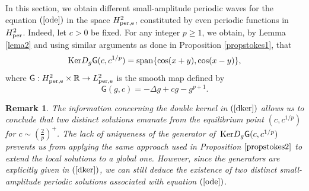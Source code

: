 \documentclass[12pt,reqno,a4paper]{amsart} %
\newcommand{\Ker}{{\rm \,Ker}}
\numberwithin{equation}{section}
\numberwithin{figure}{section}
\newtheorem{remark}[theorem]{Remark}
\begin{document}
\indent In this section, we obtain different small-amplitude periodic waves for the equation $(\ref{ode})$ in the space $H_{\rm per,e}^2$, constituted by even periodic functions in $H_{\rm per}^2$. Indeed, let $c>0$ be fixed. For any integer $p\geq1$, we obtain, by Lemma \ref{lema2} and using similar arguments as done in Proposition \ref{propstokes1}, that 
\begin{equation}\label{dker}
	{\rm Ker}D_g \mathsf{G}(c, c^{1/p}) = {\rm span}\{\cos(x+y),\cos(x-y)\},
\end{equation}
where  $\mathsf{G}: H_{\rm per,e}^{2} \times \mathbb{R} \rightarrow L_{\rm per,e}^2$ is the smooth map defined by
\begin{equation}\label{F-lyapunov1}
	\mathsf{G}(g,c) = -\Delta g+cg-g^{p+1}.
\end{equation}
\begin{remark}\label{obs123} The information concerning the double kernel in $(\ref{dker})$ allows us to conclude that two distinct solutions emanate from the equilibrium point $(c, c^{1/p})$ for $c \sim \left(\frac{2}{p}\right)^{+}$. The lack of uniqueness of the generator of $\Ker D_g \mathsf{G}(c, c^{1/p})$ prevents us from applying the same approach used in Proposition $\ref{propstokes2}$ to extend the local solutions to a global one. However, since the generators are explicitly given in $(\ref{dker})$, we can still deduce the existence of two distinct small-amplitude periodic solutions associated with equation $(\ref{ode})$.
\end{remark}
\end{document}
